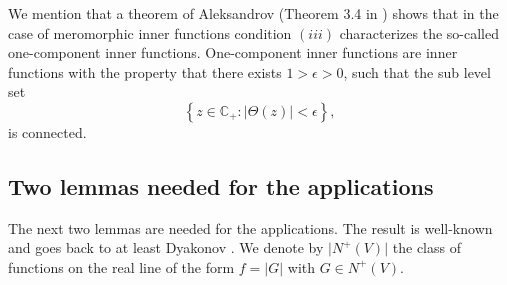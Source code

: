 \documentclass{article}[12pt]
\theoremstyle{remark}
\begin{document}
We mention that a theorem of Aleksandrov (Theorem 3.4 in \cite{MR1327512}) shows that in the case of meromorphic inner functions condition $(iii)$ characterizes the so-called one-component inner functions. One-component inner functions are inner functions with the property that there exists $1> \epsilon > 0$, such that the sub level set
\begin{equation*}
    \left\{ z \in \mathbb{C}_{+}: \lvert \Theta(z) \rvert < \epsilon\right\},
\end{equation*}
is connected.

\subsection{Two lemmas needed for the applications}

The next two lemmas are needed for the applications. The result is well-known and goes back to at least Dyakonov \cite{MR1097956}. We denote by $\lvert N^{+}(V)\rvert$ the class of functions on the real line of the form $f = \lvert G \rvert$ with $G \in N^{+}(V)$.
\end{document}
